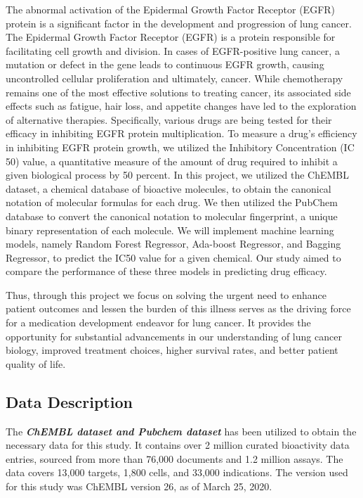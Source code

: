 \documentclass[fleqn,10pt]{SelfArx} %
\begin{document}
The abnormal activation of the Epidermal Growth Factor Receptor (EGFR) protein is a significant factor in the development and progression of lung cancer. The Epidermal Growth Factor Receptor (EGFR) is a protein responsible for facilitating cell growth and division. In cases of EGFR-positive lung cancer, a mutation or defect in the gene leads to continuous EGFR growth, causing uncontrolled cellular proliferation and ultimately, cancer. While chemotherapy remains one of the most effective solutions to treating cancer, its associated side effects such as fatigue, hair loss, and appetite changes have led to the exploration of alternative therapies. Specifically, various drugs are being tested for their efficacy in inhibiting EGFR protein multiplication. To measure a drug's efficiency in inhibiting EGFR protein growth, we utilized the Inhibitory Concentration (IC 50) value, a quantitative measure of the amount of drug required to inhibit a given biological process by 50 percent. In this project, we utilized the ChEMBL dataset, a chemical database of bioactive molecules, to obtain the canonical notation of molecular formulas for each drug. We then utilized the PubChem database to convert the canonical notation to molecular fingerprint, a unique binary representation of each molecule. We will implement machine learning models, namely Random Forest Regressor, Ada-boost Regressor, and Bagging Regressor, to predict the IC50 value for a given chemical. Our study aimed to compare the performance of these three models in predicting drug efficacy.

Thus, through this project we focus on solving the urgent need to enhance patient outcomes and lessen the burden of this illness serves as the driving force for a medication development endeavor for lung cancer. It provides the opportunity for substantial advancements in our understanding of lung cancer biology, improved treatment choices, higher survival rates, and better patient quality of life.
\subsection{Data Description}

The \textbf{\textit{ChEMBL dataset and Pubchem dataset}} has been utilized to obtain the necessary data for this study. It contains over 2 million curated bioactivity data entries, sourced from more than 76,000 documents and 1.2 million assays. The data covers 13,000 targets, 1,800 cells, and 33,000 indications. The version used for this study was ChEMBL version 26, as of March 25, 2020. 
\end{document}
